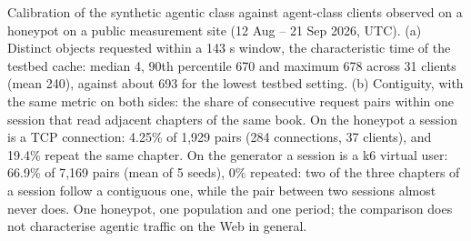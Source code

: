 Calibration of the synthetic agentic class against agent-class clients observed on a honeypot on a public measurement site (12 Aug -- 21 Sep 2026, UTC). (a) Distinct objects requested within a 143 s window, the characteristic time of the testbed cache: median 4, 90th percentile 670 and maximum 678 across 31 clients (mean 240), against about 693 for the lowest testbed setting. (b) Contiguity, with the same metric on both sides: the share of consecutive request pairs within one session that read adjacent chapters of the same book. On the honeypot a session is a TCP connection: 4.25\% of 1,929 pairs (284 connections, 37 clients), and 19.4\% repeat the same chapter. On the generator a session is a k6 virtual user: 66.9\% of 7,169 pairs (mean of 5 seeds), 0\% repeated: two of the three chapters of a session follow a contiguous one, while the pair between two sessions almost never does. One honeypot, one population and one period; the comparison does not characterise agentic traffic on the Web in general.
